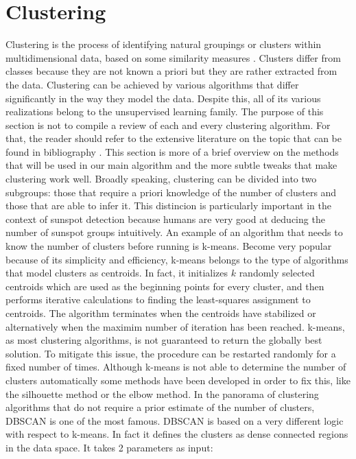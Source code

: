 \section{Clustering}
Clustering is the process of identifying natural groupings or clusters within multidimensional data, based on some similarity measures \cite{omran2007overview}. Clusters differ from classes because they are not known a priori but they are rather extracted from the data. Clustering can be achieved by various algorithms that differ significantly in the way they model the data. Despite this, all of its various realizations belong to the unsupervised learning family.
\bigbreak
\noindent The purpose of this section is not to compile a review of each and every clustering algorithm. For that, the reader should refer to the extensive literature on the topic that can be found in bibliography \cite{omran2007overview}\cite{jain1999data}. This section is more of a brief overview on the methods that will be used in our main algorithm and the more subtle tweaks that make clustering work well.
\bigbreak
\noindent Broadly speaking, clustering can be divided into two subgroups: those that require a priori knowledge of the number of clusters and those that are able to infer it. This distincion is particularly important in the context of sunspot detection because humans are very good at deducing the number of sunspot groups intuitively. An example of an algorithm that needs to know the number of clusters before running is k-means. Become very popular because of its simplicity and efficiency, k-means belongs to the type of algorithms that model clusters as centroids. In fact, it initializes $k$ randomly selected centroids which are used as the beginning points for every cluster, and then performs iterative calculations to finding the least-squares assignment to centroids. The algorithm terminates when the centroids have stabilized or alternatively when the maximim number of iteration has been reached. k-means, as most clustering algorithms, is not guaranteed to return the globally best solution. To mitigate this issue, the procedure can be restarted randomly for a fixed number of times. Although k-means is not able to determine the number of clusters automatically some methods have been developed in order to fix this, like the silhouette method \cite{rousseeuw1987silhouettes} or the elbow method.
\bigbreak
\noindent In the panorama of clustering algorithms that do not require a prior estimate of the number of clusters, DBSCAN \cite{ester1996density} is one of the most famous. DBSCAN is based on a very different logic with respect to k-means. In fact it defines the clusters as dense connected regions in the data space. It takes 2 parameters as input:
